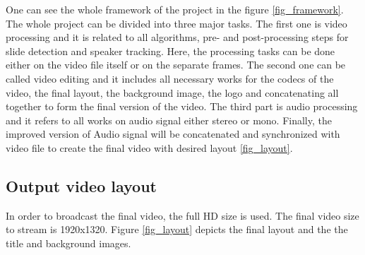 \documentclass[[12pt,DIV14,BCOR12mm,a4paper,footexclude,headinclude,halfparskip-,twoside,openright,cleardoubleempty,idxtotoc,bibtotoc]{article}
\begin{document}
One can see the whole framework of the project in the figure \ref{fig_framework}. The whole project can be divided into three major tasks. The first one is video processing and it is related to all algorithms, pre- and post-processing steps for slide detection and speaker tracking. Here, the processing tasks can be done either on the video file itself or on the separate frames. The second one can be called video editing and it includes all necessary works for the codecs of the video, the final layout, the background image, the logo and concatenating all together to form the final version of the video. The third part is audio processing and it refers to all works on audio signal either stereo or mono. Finally, the improved version of Audio signal will be concatenated and synchronized with video file to create the final video with desired layout \ref{fig_layout}. 


\subsection{Output video layout}

In order to broadcast the final video, the full HD size is used. The final video size to stream is 1920x1320. Figure \ref{fig_layout} depicts the final layout and the the title and background images.
\end{document}
